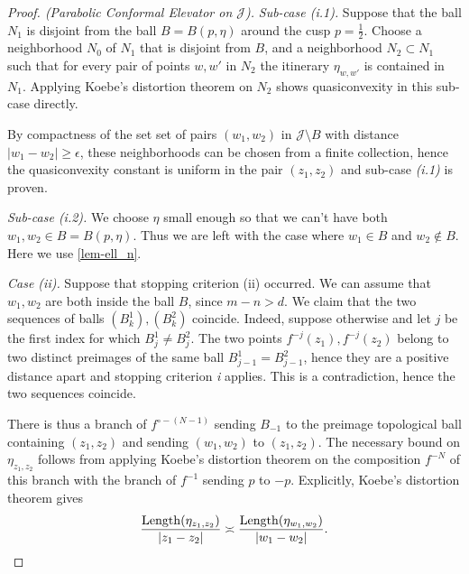 \begin{proof}[Proof. (Parabolic Conformal Elevator on $\mathcal J$)]
\emph{Sub-case (i.1).} Suppose that the ball $N_1$ is disjoint from the ball $B=B(p, \eta)$ around the cusp $p=\tfrac 12$.
Choose a neighborhood $N_0$ of $N_1$ that is disjoint from $B$, and a neighborhood $N_2 \subset N_1$ such that for every pair of points $w,w'$ in $N_2$ the itinerary $\eta_{w,w'}$ is contained in $N_1$. Applying Koebe's distortion theorem on $N_2$ shows quasiconvexity in this sub-case directly. 

By compactness of the set set of pairs $(w_1,w_2)$ in $\mathcal J \setminus B$ with distance $|w_1-w_2| \geq \epsilon$, these neighborhoods can be chosen from a finite collection, hence the quasiconvexity constant is uniform in the pair $(z_1, z_2)$ and sub-case \emph{(i.1)} is proven.

\emph{Sub-case (i.2).}  We choose $\eta$ small enough so that we can't have both $w_1,w_2 \in B=B(p,\eta)$. Thus we are left with the case where $w_1 \in B$ and $w_2 \not \in B$. Here we use \cref{lem-ell_n}.
%

\emph{Case (ii).} Suppose that stopping criterion (ii) occurred. We can assume that $w_1,w_2$ are both inside the ball $B$, since $m-n>d$. We claim that the two sequences of balls $(B^1_k), (B^2_k)$ coincide. Indeed, suppose otherwise and let $j$ be the first index for which $B^1_j \neq B^2_j$. The two points $f^{-j}(z_1), f^{-j}(z_2)$ belong to two distinct preimages of the same ball $B^1_{j-1}= B^2_{j-1}$, hence they are a positive distance apart and stopping criterion \emph{i} applies. This is a contradiction, hence the two sequences coincide. 

There is thus a branch of $f^{\circ -(N-1)}$ sending $B_{-1}$ to the preimage topological ball containing $(z_1,z_2)$ and sending $(w_1,w_2)$ to $(z_1,z_2)$. The necessary bound on $\eta_{z_1,z_2}$ follows from applying Koebe's distortion theorem on the composition $f^{-N}$ of this branch with the branch of $f^{-1}$ sending $p$ to $-p$. Explicitly, Koebe's distortion theorem gives 
\begin{equation}
	\frac{\operatorname{Length}(\eta_{z_1,z_2})}{|z_1-z_2|} \asymp \frac{\operatorname{Length}(\eta_{w_1,w_2})}{|w_1-w_2|}.
\end{equation}


\end{proof}
